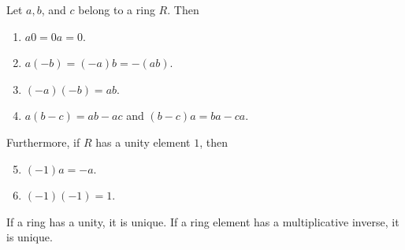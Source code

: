 
\begin{theorem}
	Let $a,b$, and $c$ belong to a ring $R$. Then
	\begin{enumerate}
		\item $a0 = 0a = 0$.
		\item $a(-b) = (-a)b = -(ab)$.
		\item $(-a)(-b) = ab$.
		\item $a(b-c) = ab - ac$ and $(b-c)a = ba - ca$.
	\end{enumerate}
	Furthermore, if $R$ has a unity element $1$, then
	\begin{enumerate}
		\setcounter{enumi}{4}
		\item $(-1)a = -a$.
		\item $(-1)(-1) = 1$.
	\end{enumerate}
\end{theorem}

\begin{theorem}
	If a ring has a unity, it is unique. If a ring element has a multiplicative inverse, it is unique.
\end{theorem}
